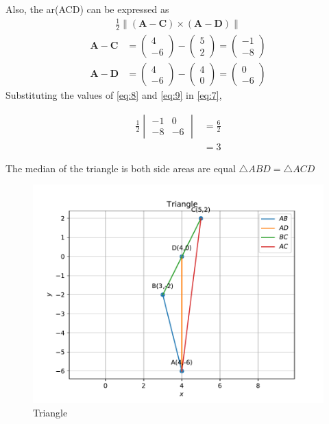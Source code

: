 \documentclass[12pt]{article}
\newcommand{\mydet}[1]{\ensuremath{\begin{vmatrix}#1\end{vmatrix}}}
\providecommand{\brak}[1]{\ensuremath{\left(#1\right)}}
\newcommand{\myvec}[1]{\ensuremath{\begin{pmatrix}#1\end{pmatrix}}}
\providecommand{\norm}[1]{\left\lVert#1\right\rVert}
\let\vec\mathbf
\begin{document}
		Also, the ar(ACD) can be expressed as
  \begin{align}
  \frac{1}{2} \norm{\brak{\vec{A}-\vec{C}}  \times 
   \brak{\vec{A}- \vec{D}}} \label{eq:7}
\end{align}
\begin{align}
	\vec{A}- \vec{C} &= \myvec{4\\ -6}-\myvec{5\\ 2}=\myvec{-1\\ -8}\label{eq:8} \\
	  \vec{A}- \vec{D} &= \myvec{4\\ -6}-\myvec{4\\ 0}=\myvec{0\\ -6}\label{eq:9} 
  \end{align}
		Substituting the values of \eqref{eq:8} and \eqref{eq:9} in \eqref{eq:7},

		\begin{align}
	\frac{1}{2}\mydet{-1 & 0\\-8 & -6}  
	&=	\frac{6}{2}\\
	&= 3
\end{align}
		
The median of the triangle is  both side areas are equal $\triangle ABD=\triangle ACD$
\begin{figure}[h]
\centering
\includegraphics[width=\columnwidth]{fig.pdf}
\caption{Triangle}
\label{fig-}
\end{figure} 
\end{document}
